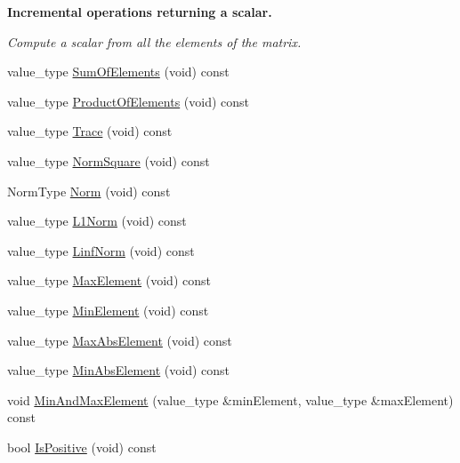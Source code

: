 \begin{Indent}{\bf Incremental operations returning a scalar.}\par
{\em Compute a scalar from all the elements of the matrix. }\begin{DoxyCompactItemize}
\item 
value\-\_\-type \hyperlink{classvct_dynamic_const_matrix_base_a134c1b6991bafceabe7bb6baa08e05b9}{Sum\-Of\-Elements} (void) const 
\item 
value\-\_\-type \hyperlink{classvct_dynamic_const_matrix_base_ae2401f9df53f4d7b880c271c4117d542}{Product\-Of\-Elements} (void) const 
\item 
value\-\_\-type \hyperlink{classvct_dynamic_const_matrix_base_a69cd40632166abe056fc04afebd3922f}{Trace} (void) const 
\item 
value\-\_\-type \hyperlink{classvct_dynamic_const_matrix_base_a9ab094a525c18fa94af35fc9b7c8b675}{Norm\-Square} (void) const 
\item 
Norm\-Type \hyperlink{classvct_dynamic_const_matrix_base_ae921451637b0607e37648a71903209c5}{Norm} (void) const 
\item 
value\-\_\-type \hyperlink{classvct_dynamic_const_matrix_base_af283598f2cd1fe140c29c7c797bbacae}{L1\-Norm} (void) const 
\item 
value\-\_\-type \hyperlink{classvct_dynamic_const_matrix_base_aa5e4b0efae23402d75dce86bb4b0357b}{Linf\-Norm} (void) const 
\item 
value\-\_\-type \hyperlink{classvct_dynamic_const_matrix_base_a0b851bf9b21d090b357fd0382d9149f6}{Max\-Element} (void) const 
\item 
value\-\_\-type \hyperlink{classvct_dynamic_const_matrix_base_a7c06585d5f8b84c9b7254aa4d5bf87d5}{Min\-Element} (void) const 
\item 
value\-\_\-type \hyperlink{classvct_dynamic_const_matrix_base_aa51ebe99fc5bd04094b69b55f36efe3c}{Max\-Abs\-Element} (void) const 
\item 
value\-\_\-type \hyperlink{classvct_dynamic_const_matrix_base_a9364e35da48457ef1e9644297cf8b5b9}{Min\-Abs\-Element} (void) const 
\item 
void \hyperlink{classvct_dynamic_const_matrix_base_ac39de02aa220ba1f5d6808b98f96997c}{Min\-And\-Max\-Element} (value\-\_\-type \&min\-Element, value\-\_\-type \&max\-Element) const 
\item 
bool \hyperlink{classvct_dynamic_const_matrix_base_a6131a3d91b7c0558f1e16a0035b8ef29}{Is\-Positive} (void) const 
\item 

\end{DoxyCompactItemize}
\end{Indent}
